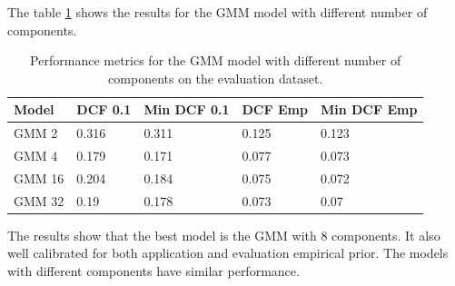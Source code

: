 \documentclass{article}
\begin{document}
The table \ref{tab:evaluation_gmm} shows the results for the GMM model with different number of components.

\begin{table}
    \centering
    \begin{tabularx}{\textwidth}{lXXXX}
        \toprule
        \textbf{Model} & \textbf{DCF 0.1} & \textbf{Min DCF 0.1} & \textbf{DCF Emp} & \textbf{Min DCF Emp} \\
        \midrule
        GMM 2 & 0.316 & 0.311 & 0.125 & 0.123 \\
        GMM 4 & 0.179 & 0.171 & 0.077 & 0.073 \\
        GMM 16 & 0.204 & 0.184 & 0.075 & 0.072 \\
        GMM 32 & 0.19 & 0.178 & 0.073 & 0.07 \\
        \bottomrule
    \end{tabularx}
    \caption{Performance metrics for the GMM model with different number of components on the evaluation dataset.}
    \label{tab:evaluation_gmm}
\end{table}

The results show that the best model is the GMM with 8 components. It also well calibrated for both application and evaluation empirical prior. The models with different components have similar performance.
\end{document}
